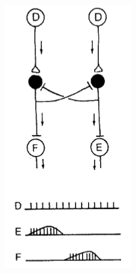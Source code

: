\begin{figure}[h!]
	\centering
	\begin{subfigure}{.2\textwidth}
		\includegraphics[width=\textwidth]{figures/ch05_HalfCenter.png}

\end{subfigure}
\end{figure}
